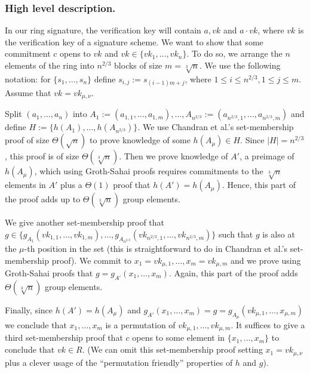 \subsubsection{High level description.}
In our ring signature, the verification key will contain $a,vk$ and $a\cdot vk$, where $vk$ is the verification key of a signature scheme. We want to show that some commitment $c$ opens to $vk$ and $vk\in\{vk_1,\ldots,vk_n\}$. To do so, we arrange the $n$ elements of the ring into $n^{2/3}$ blocks of size $m=\sqrt[3]{n}$. We use the following notation: for $\{s_1,\ldots, s_n\}$ define $s_{i,j}:=s_{(i-1)m+j}$, where  $1\leq i \leq n^{2/3},1\leq  j \leq m$. Assume that $vk = vk_{\mu,\nu}$.

Split $(a_{1},\ldots, a_{n})$ into $A_1 := (a_{1,1},\ldots,a_{1,m}),\ldots, A_{n^{2/3}} := (a_{n^{2/3},1},\ldots,\allowbreak a_{n^{2/3},m})$ and define $H\allowbreak:=\{h(A_1),\allowbreak\ldots,\allowbreak h(A_{n^{2/3}})\}.$  
We use Chandran et al.'s set-membership proof of size $\Theta(\sqrt{n})$ to prove knowledge of some $h(A_\mu)\in H$. Since $|H|=n^{2/3}$, this proof is of size $\Theta(\sqrt[3]{n})$. Then we prove knowledge of $A'$, a preimage of $h(A_\mu)$, which using Groth-Sahai proofs requires commitments to the $\sqrt[3]{n}$ elements in $A'$ plus a $\Theta(1)$ proof that $h(A')=h(A_\mu)$. Hence, this part of the proof adds up to $\Theta(\sqrt[3]{n})$ group elements.

We give another set-membership proof that
$g\in\{
g_{A_1}(vk_{1,1},\ldots,vk_{1,m}),
\ldots,\allowbreak
g_{A_{n^{2/3}}}(
	vk_{n^{2/3},1},
	\ldots,
	vk_{n^{2/3},m})\}$ such that $g$ is also at the $\mu$-th position in the set (this is straightforward to do in Chandran et al.'s set-membership proof).
We commit to $x_1=vk_{\mu,1},\ldots,x_m=vk_{\mu,m}$ and we prove using Groth-Sahai proofs that $g = g_{A'}(x_1,\ldots,x_m)$. Again, this part of the proof adds $\Theta(\sqrt[3]{n})$ group elements.

Finally, since $h(A')=h(A_\mu)$ and $g_{A'}(x_1,\ldots,x_m) = g = g_{A_{\mu}}(vk_{\mu,1},\ldots,x_{\mu,m})$ we conclude that $x_1,\ldots,x_m$ is a permutation of $vk_{\mu,1},\ldots,vk_{\mu,m}$. It suffices to give a third set-membership proof that $c$ opens to some element in $\{x_1,\ldots,x_m\}$ to conclude that $vk\in R$. (We can omit this set-membership proof setting $x_1 =vk_{\mu,\nu}$ plus a clever usage of the ``permutation friendly'' properties of $h$ and $g$).